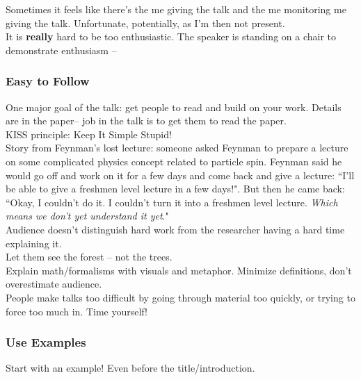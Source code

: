 Sometimes it feels like there's the me giving the talk and the me monitoring me giving the talk. Unfortunate, potentially, as I'm then not present.\\

It is {\bf really} hard to be too enthusiastic. The speaker is standing on a chair to demonstrate enthusiasm --\\


\subsubsection{Easy to Follow}

One major goal of the talk: get people to read and build on your work. Details are in the paper-- job in the talk is to get them to read the paper. \\

KISS principle: Keep It Simple Stupid! \\

Story from Feynman's lost lecture: someone asked Feynman to prepare a lecture on some complicated physics concept related to particle spin. Feynman said he would go off and work on it for a few days and come back and give a lecture: ``I'll be able to give a freshmen level lecture in a few days!". But then he came back: ``Okay, I couldn't do it. I couldn't turn it into a freshmen level lecture. {\it Which means we don't yet understand it yet}." \\

Audience doesn't distinguish hard work from the researcher having a hard time explaining it. \\

Let them see the forest -- not the trees. \\

Explain math/formalisms with visuals and metaphor. Minimize definitions, don't overestimate audience. \\

People make talks too difficult by going through material too quickly, or trying to force too much in. Time yourself!

\subsubsection{Use Examples}

Start with an example! Even before the title/introduction.  \\

